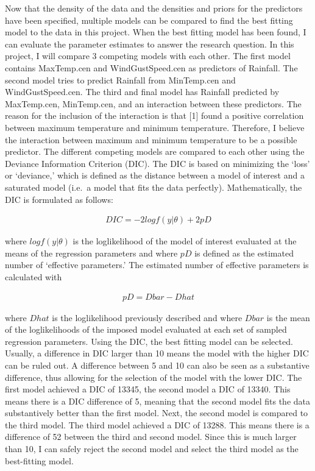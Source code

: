 \documentclass[
]{article}
\begin{document}
Now that the density of the data and the densities and priors for the
predictors have been specified, multiple models can be compared to find
the best fitting model to the data in this project. When the best
fitting model has been found, I can evaluate the parameter estimates to
answer the research question. In this project, I will compare 3
competing models with each other. The first model contains MaxTemp.cen
and WindGustSpeed.cen as predictors of Rainfall. The second model tries
to predict Rainfall from MinTemp.cen and WindGustSpeed.cen. The third
and final model has Rainfall predicted by MaxTemp.cen, MinTemp.cen, and
an interaction between these predictors. The reason for the inclusion of
the interaction is that {[}1{]} found a positive correlation between
maximum temperature and minimum temperature. Therefore, I believe the
interaction between maximum and minimum temperature to be a possible
predictor. The different competing models are compared to each other
using the Deviance Information Criterion (DIC). The DIC is based on
minimizing the `loss' or `deviance,' which is defined as the distance
between a model of interest and a saturated model (i.e.~a model that
fits the data perfectly). Mathematically, the DIC is formulated as
follows:

\begin{align}
  DIC = -2 log f(y|\theta) + 2pD
\end{align}

where \(log f(y|\theta)\) is the loglikelihood of the model of interest
evaluated at the means of the regression parameters and where \(pD\) is
defined as the estimated number of `effective parameters.' The estimated
number of effective parameters is calculated with

\begin{align}
  pD = Dbar - Dhat 
\end{align}

where \(Dhat\) is the loglikelihood previously described and where
\(Dbar\) is the mean of the loglikelihoods of the imposed model
evaluated at each set of sampled regression parameters. Using the DIC,
the best fitting model can be selected. Usually, a difference in DIC
larger than 10 means the model with the higher DIC can be ruled out. A
difference between 5 and 10 can also be seen as a substantive
difference, thus allowing for the selection of the model with the lower
DIC. The first model achieved a DIC of 13345, the second model a DIC of
13340. This means there is a DIC difference of 5, meaning that the
second model fits the data substantively better than the first model.
Next, the second model is compared to the third model. The third model
achieved a DIC of 13288. This means there is a difference of 52 between
the third and second model. Since this is much larger than 10, I can
safely reject the second model and select the third model as the
best-fitting model.
\end{document}
